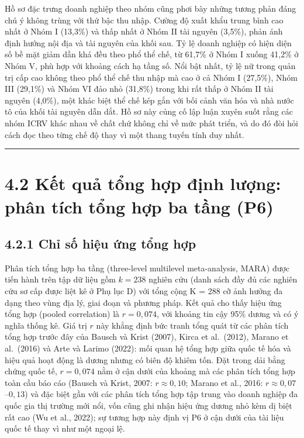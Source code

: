 \documentclass[
  a4paper,
  13pt]{extreport}
\begin{document}
Hồ sơ đặc trưng doanh nghiệp theo nhóm cũng phơi bày những tương phản
đáng chú ý không trùng với thứ bậc thu nhập. Cường độ xuất khẩu trung
bình cao nhất ở Nhóm I (13,3\%) và thấp nhất ở Nhóm II tài nguyên
(3,5\%), phản ánh định hướng nội địa và tài nguyên của khối sau. Tỷ lệ
doanh nghiệp có hiện diện số bề mặt giảm dần khá đều theo phổ thể chế,
từ 61,7\% ở Nhóm I xuống 41,2\% ở Nhóm V, phù hợp với khoảng cách hạ
tầng số. Nổi bật nhất, tỷ lệ nữ trong quản trị cấp cao không theo phổ
thể chế thu nhập mà cao ở cả Nhóm I (27,5\%), Nhóm III (29,1\%) và Nhóm
VI đảo nhỏ (31,8\%) trong khi rất thấp ở Nhóm II tài nguyên (4,0\%), một
khác biệt thể chế kép gắn với bối cảnh văn hóa và nhà nước tô của khối
tài nguyên dẫn dắt. Hồ sơ này củng cố lập luận xuyên suốt rằng các nhóm
ICRV khác nhau về chất chứ không chỉ về mức phát triển, và do đó đòi hỏi
cách đọc theo từng chế độ thay vì một thang tuyến tính duy nhất.

\begin{center}\rule{0.5\linewidth}{0.5pt}\end{center}

\hypertarget{kux1ebft-quux1ea3-tux1ed5ng-hux1ee3p-ux111ux1ecbnh-lux1b0ux1ee3ng-phuxe2n-tuxedch-tux1ed5ng-hux1ee3p-ba-tux1ea7ng-p6}{%
\section{4.2 Kết quả tổng hợp định lượng: phân tích tổng hợp ba tầng
(P6)}\label{kux1ebft-quux1ea3-tux1ed5ng-hux1ee3p-ux111ux1ecbnh-lux1b0ux1ee3ng-phuxe2n-tuxedch-tux1ed5ng-hux1ee3p-ba-tux1ea7ng-p6}}

\hypertarget{chux1ec9-sux1ed1-hiux1ec7u-ux1ee9ng-tux1ed5ng-hux1ee3p}{%
\subsection{4.2.1 Chỉ số hiệu ứng tổng
hợp}\label{chux1ec9-sux1ed1-hiux1ec7u-ux1ee9ng-tux1ed5ng-hux1ee3p}}

Phân tích tổng hợp ba tầng (three-level multilevel meta-analysis, MARA)
được tiến hành trên tập dữ liệu gồm \(k = 238\) nghiên cứu (danh sách
đầy đủ các nghiên cứu sơ cấp được liệt kê ở Phụ lục D) với tổng cộng K =
288 cỡ ảnh hưởng đa dạng theo vùng địa lý, giai đoạn và phương pháp. Kết
quả cho thấy hiệu ứng tổng hợp (pooled correlation) là \(r = 0{,}074\),
với khoảng tin cậy 95\% dương và có ý nghĩa thống kê. Giá trị \(r\) này
khẳng định bức tranh tổng quát từ các phân tích tổng hợp trước đây của
Bausch và Krist (2007), Kirca et al.~(2012), Marano et al.~(2016) và
Arte và Larimo (2022): mối quan hệ tổng hợp giữa quốc tế hóa và hiệu quả
hoạt động là dương nhưng có biên độ khiêm tốn. Đặt trong dải bằng chứng
quốc tế, \(r = 0{,}074\) nằm ở cận dưới của khoảng mà các phân tích tổng
hợp toàn cầu báo cáo (Bausch và Krist, 2007: \(r \approx 0{,}10\);
Marano et al., 2016: \(r \approx 0{,}07\)--\(0{,}13\)) và đặc biệt gần
với các phân tích tổng hợp tập trung vào doanh nghiệp đa quốc gia thị
trường mới nổi, vốn cũng ghi nhận hiệu ứng dương nhỏ kèm dị biệt rất cao
(Wu et al., 2022); sự tương hợp này định vị P6 ở cận dưới của tài liệu
quốc tế thay vì như một ngoại lệ.
\end{document}
